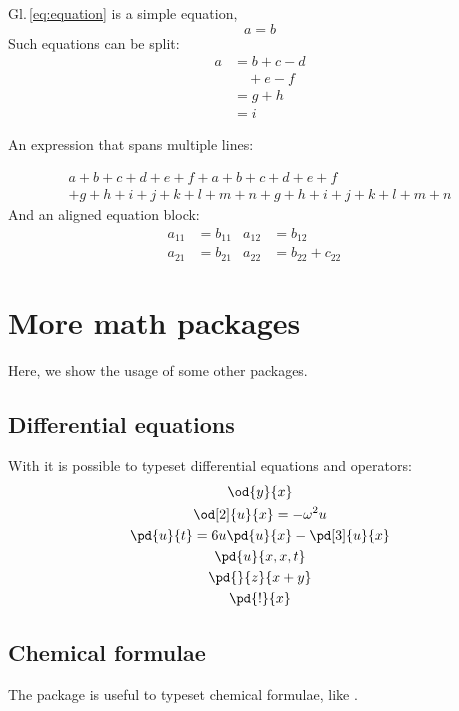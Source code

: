 Gl.\,\ref{eq:equation} is a simple equation,
\begin{equation}\label{eq:equation}
	a = b
\end{equation}
Such equations can be split:
\begin{equation}
	\begin{split}
		a& = b+c-d\\
		& \quad + e - f\\
		& = g+h\\
		& = i
	\end{split}
\end{equation}

An expression that spans multiple lines:

\begin{multline}
	a + b + c +d + e + f + a + b + c +d + e + f \\
	+ g + h + i + j + k + l + m + n+ g + h + i + j + k + l + m + n
\end{multline}
And an aligned equation block:
\begin{align}
	a_{11} & = b_{11}          &
	a_{12} & = b_{12}          & \\
	a_{21} & = b_{21}          &
	a_{22} & = b_{22} + c_{22}
\end{align}

\section{More math packages}
Here, we show the usage of some other packages.
\subsection{Differential equations}
With  it is possible to typeset differential equations and operators:
\begin{gather}
	\od{y}{x}\\
	\od[2]{u}{x} = -\omega^2 u\\
	\pd{u}{t} = 6u \pd{u}{x} - \pd[3]{u}{x}\\
	\pd{u}{x,x,t}\\
	\pd{}{z}{x+y}\\
	\pd{!}{x}
\end{gather}

\subsection{Chemical formulae}
The package  is useful to typeset chemical formulae, like .

